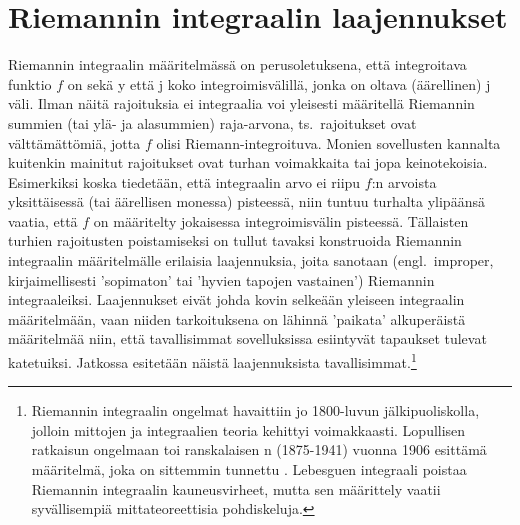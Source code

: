 \section{Riemannin integraalin laajennukset} \label{integraalin laajennuksia}
\alku

Riemannin integraalin määritelmässä on perusoletuksena, että integroitava funktio $f$ on sekä 
y että j koko integroimisvälillä, jonka on oltava 
(äärellinen) j väli. Ilman näitä rajoituksia ei integraalia voi
yleisesti määritellä Riemannin summien (tai ylä- ja alasummien) raja-arvona, ts.\ rajoitukset
ovat välttämättömiä, jotta $f$ olisi Riemann-integroituva. Monien sovellusten kannalta
kuitenkin mainitut rajoitukset ovat turhan voimakkaita tai jopa keinotekoisia. Esimerkiksi
koska tiedetään, että integraalin arvo ei riipu $f$:n arvoista yksittäisessä (tai äärellisen
monessa) pisteessä, niin tuntuu turhalta  ylipäänsä vaatia, että $f$ on määritelty jokaisessa
integroimisvälin pisteessä. Tällaisten turhien rajoitusten poistamiseksi on tullut tavaksi
konstruoida Riemannin integraalin määritelmälle erilaisia laajennuksia, joita sanotaan
%
 (engl.\ improper, kirjaimellisesti 'sopimaton' tai 'hyvien tapojen
vastainen') Riemannin
integraaleiksi. Laajennukset eivät johda kovin selkeään yleiseen integraalin määritelmään, vaan
niiden tarkoituksena on lähinnä 'paikata' alkuperäistä määritelmää niin, että tavallisimmat
sovelluksissa esiintyvät tapaukset tulevat katetuiksi. Jatkossa esitetään näistä laajennuksista
tavallisimmat.\footnote[2]{Riemannin integraalin ongelmat havaittiin jo 1800-luvun
jälkipuoliskolla, jolloin mittojen ja integraalien teoria kehittyi voimakkaasti. Lopullisen
ratkaisun ongelmaan toi ranskalaisen n (1875-1941) vuonna 1906 esittämä
määritelmä, joka on sittemmin tunnettu . Lebesguen integraali
poistaa Riemannin integraalin kauneusvirheet, mutta sen määrittely vaatii syvällisempiä
mittateoreettisia pohdiskeluja.  }


